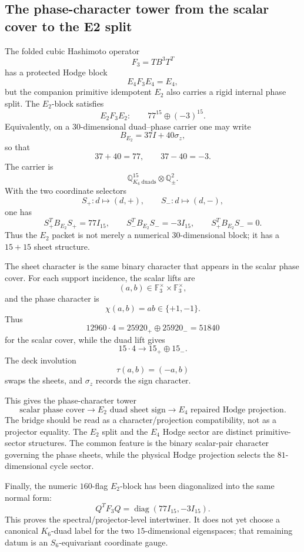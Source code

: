 \subsection{The phase-character tower from the scalar cover to the E2 split}
\label{subsec:bt643-character-tower}

The folded cubic Hashimoto operator
\[
F_3=TB^3T^T
\]
has a protected Hodge block
\[
E_4F_3E_4=E_4,
\]
but the companion primitive idempotent \(E_2\) also carries a rigid internal
phase split.  The \(E_2\)-block satisfies
\[
E_2F_3E_2:\qquad 77^{15}\oplus(-3)^{15}.
\]
Equivalently, on a \(30\)-dimensional duad--phase carrier one may write
\[
B_{E_2}=37I+40\sigma_z,
\]
so that
\[
37+40=77,\qquad 37-40=-3.
\]
The carrier is
\[
\mathbb Q^{15}_{K_6\mathrm{\ duads}}\otimes \mathbb Q^2_{\pm}.
\]
With the two coordinate selectors
\[
S_+:d\mapsto(d,+),\qquad S_-:d\mapsto(d,-),
\]
one has
\[
S_+^TB_{E_2}S_+=77I_{15},\qquad
S_-^TB_{E_2}S_-=-3I_{15},\qquad
S_+^TB_{E_2}S_-=0.
\]
Thus the \(E_2\) packet is not merely a numerical \(30\)-dimensional block; it
has a \(15+15\) sheet structure.

The sheet character is the same binary character that appears in the scalar
phase cover.  For each support incidence, the scalar lifts are
\[
(a,b)\in \mathbb F_3^\times\times\mathbb F_3^\times,
\]
and the phase character is
\[
\chi(a,b)=ab\in\{+1,-1\}.
\]
Thus
\[
12960\cdot4=25920_+\oplus25920_-=51840
\]
for the scalar cover, while the duad lift gives
\[
15\cdot4\longrightarrow 15_+\oplus15_-.
\]
The deck involution
\[
\tau(a,b)=(-a,b)
\]
swaps the sheets, and \(\sigma_z\) records the sign character.

This gives the phase-character tower
\[
\boxed{
\text{scalar phase cover}
\longrightarrow
E_2\text{ duad sheet sign}
\longrightarrow
E_4\text{ repaired Hodge projection}.
}
\]
The bridge should be read as a character/projection compatibility, not as a
projector equality.  The \(E_2\) split and the \(E_4\) Hodge sector are distinct
primitive-sector structures.  The common feature is the binary scalar-pair
character governing the phase sheets, while the physical Hodge projection
selects the \(81\)-dimensional cycle sector.

Finally, the numeric \(160\)-flag \(E_2\)-block has been diagonalized into the
same normal form:
\[
Q^TF_3Q=\operatorname{diag}(77I_{15},-3I_{15}).
\]
This proves the spectral/projector-level intertwiner.  It does not yet choose a
canonical \(K_6\)-duad label for the two \(15\)-dimensional eigenspaces; that
remaining datum is an \(S_6\)-equivariant coordinate gauge.
